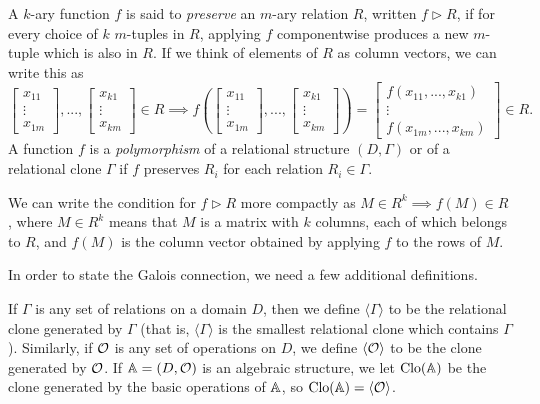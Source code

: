 \documentclass[letterpaper,11pt]{article}
\DeclareMathOperator{\Clo}{Clo}
\begin{document}
\begin{defn} A $k$-ary function $f$ is said to \emph{preserve} an $m$-ary relation $R$, written $f \rhd R$, if for every choice of $k$ $m$-tuples in $R$, applying $f$ componentwise produces a new $m$-tuple which is also in $R$. If we think of elements of $R$ as column vectors, we can write this as
\[
\begin{bmatrix} x_{11}\\ \vdots\\ x_{1m} \end{bmatrix}, ..., \begin{bmatrix} x_{k1}\\ \vdots\\ x_{km} \end{bmatrix} \in R \implies f\left( \begin{bmatrix} x_{11}\\ \vdots\\ x_{1m} \end{bmatrix}, ..., \begin{bmatrix} x_{k1}\\ \vdots\\ x_{km} \end{bmatrix}\right) = \begin{bmatrix} f(x_{11}, ..., x_{k1})\\ \vdots\\ f(x_{1m}, ..., x_{km}) \end{bmatrix} \in R.
\]
A function $f$ is a \emph{polymorphism} of a relational structure $(D, \Gamma)$ or of a relational clone $\Gamma$ if $f$ preserves $R_i$ for each relation $R_i \in \Gamma$.
\end{defn}

We can write the condition for $f \rhd R$ more compactly as $M \in R^k \implies f(M) \in R$, where $M \in R^k$ means that $M$ is a matrix with $k$ columns, each of which belongs to $R$, and $f(M)$ is the column vector obtained by applying $f$ to the rows of $M$.

In order to state the Galois connection, we need a few additional definitions.

\begin{defn} If $\Gamma$ is any set of relations on a domain $D$, then we define $\langle \Gamma \rangle$ to be the relational clone generated by $\Gamma$ (that is, $\langle \Gamma \rangle$ is the smallest relational clone which contains $\Gamma$). Similarly, if $\mathcal{O}$ is any set of operations on $D$, we define $\langle \mathcal{O} \rangle$ to be the clone generated by $\mathcal{O}$. If $\mathbb{A} = (D, \mathcal{O})$ is an algebraic structure, we let $\Clo(\bA)$ be the clone generated by the basic operations of $\mathbb{A}$, so $\Clo(\bA) = \langle \cO\rangle$.
\end{defn}
\end{document}
